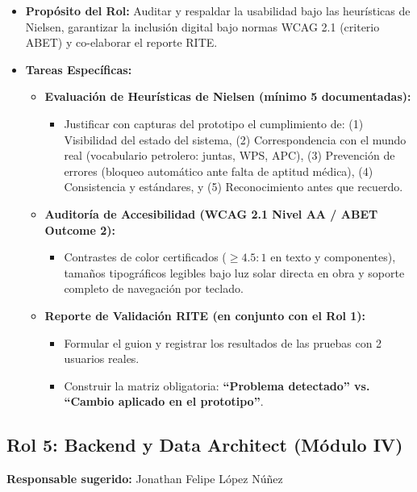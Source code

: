 \documentclass[11pt,letterpaper]{article}
\begin{document}
\begin{itemize}
    \item \textbf{Propósito del Rol:} Auditar y respaldar la usabilidad bajo las heurísticas de Nielsen, garantizar la inclusión digital bajo normas WCAG 2.1 (criterio ABET) y co-elaborar el reporte RITE.
    \item \textbf{Tareas Específicas:}
    \begin{itemize}
        \item \textbf{Evaluación de Heurísticas de Nielsen (mínimo 5 documentadas):}
        \begin{itemize}
            \item Justificar con capturas del prototipo el cumplimiento de: (1) Visibilidad del estado del sistema, (2) Correspondencia con el mundo real (vocabulario petrolero: juntas, WPS, APC), (3) Prevención de errores (bloqueo automático ante falta de aptitud médica), (4) Consistencia y estándares, y (5) Reconocimiento antes que recuerdo.
        \end{itemize}
        \item \textbf{Auditoría de Accesibilidad (WCAG 2.1 Nivel AA / ABET Outcome 2):}
        \begin{itemize}
            \item Contrastes de color certificados ($\ge 4.5:1$ en texto y componentes), tamaños tipográficos legibles bajo luz solar directa en obra y soporte completo de navegación por teclado.
        \end{itemize}
        \item \textbf{Reporte de Validación RITE (en conjunto con el Rol 1):}
        \begin{itemize}
            \item Formular el guion y registrar los resultados de las pruebas con 2 usuarios reales.
            \item Construir la matriz obligatoria: \textbf{``Problema detectado'' vs. ``Cambio aplicado en el prototipo''}.
        \end{itemize}
    \end{itemize}
\end{itemize}

\subsection{Rol 5: Backend y Data Architect (Módulo IV)}
\textbf{Responsable sugerido:} Jonathan Felipe López Núñez
\end{document}
